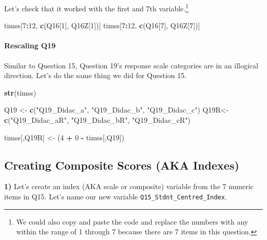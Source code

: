 \documentclass[
]{article}
\newenvironment{Shaded}{\begin{snugshade}}{\end{snugshade}}
\newcommand{\DecValTok}[1]{\textcolor[rgb]{0.00,0.00,0.81}{#1}}
\newcommand{\KeywordTok}[1]{\textcolor[rgb]{0.13,0.29,0.53}{\textbf{#1}}}
\newcommand{\NormalTok}[1]{#1}
\newcommand{\OperatorTok}[1]{\textcolor[rgb]{0.81,0.36,0.00}{\textbf{#1}}}
\newcommand{\StringTok}[1]{\textcolor[rgb]{0.31,0.60,0.02}{#1}}
\begin{document}
Let's check that it worked with the first and 7th variable.\footnote{We could also copy and paste the code and replace the numbers with any within the range of 1 through 7 because there are 7 items in this question.}

\begin{Shaded}
\begin{Highlighting}[]
\NormalTok{timss[}\DecValTok{7}\OperatorTok{:}\DecValTok{12}\NormalTok{, }\KeywordTok{c}\NormalTok{(Q16[}\DecValTok{1}\NormalTok{], Q16Z[}\DecValTok{1}\NormalTok{])]}
\NormalTok{timss[}\DecValTok{7}\OperatorTok{:}\DecValTok{12}\NormalTok{, }\KeywordTok{c}\NormalTok{(Q16[}\DecValTok{7}\NormalTok{], Q16Z[}\DecValTok{7}\NormalTok{])]}
\end{Highlighting}
\end{Shaded}

\hypertarget{rescaling-q19}{%
\paragraph{Rescaling Q19}\label{rescaling-q19}}

Similar to Question 15, Question 19's response scale categories are in an illogical direction. Let's do the same thing we did for Question 15.

\begin{Shaded}
\begin{Highlighting}[]
\KeywordTok{str}\NormalTok{(timss) }

\NormalTok{Q19 <-}\StringTok{ }\KeywordTok{c}\NormalTok{(}\StringTok{"Q19_Didac_a"}\NormalTok{,  }\StringTok{"Q19_Didac_b"}\NormalTok{,  }\StringTok{"Q19_Didac_c"}\NormalTok{)}
\NormalTok{Q19R<-}\StringTok{ }\KeywordTok{c}\NormalTok{(}\StringTok{"Q19_Didac_aR"}\NormalTok{, }\StringTok{"Q19_Didac_bR"}\NormalTok{, }\StringTok{"Q19_Didac_cR"}\NormalTok{) }

\NormalTok{timss[,Q19R] <-}\StringTok{ }\NormalTok{(}\DecValTok{4} \OperatorTok{+}\StringTok{ }\DecValTok{0} \OperatorTok{-}\StringTok{ }\NormalTok{timss[,Q19]) }
\end{Highlighting}
\end{Shaded}

\hypertarget{creating-composite-scores-aka-indexes}{%
\subsection{Creating Composite Scores (AKA Indexes)}\label{creating-composite-scores-aka-indexes}}

\textbf{1)} Let's create an index (AKA scale or composite) variable from the 7 numeric items in Q15. Let's name our new variable \texttt{Q15\_Stdnt\_Centred\_Index}.
\end{document}
